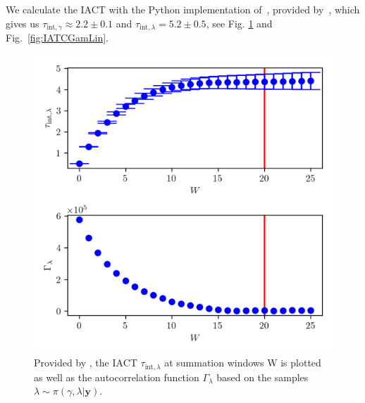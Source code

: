 We calculate the IACT with the Python implementation of~\cite{wolff2004monte}, provided by~\cite{drikHesse}, which gives us $\tau_{\text{int}, \gamma} \approx 2.2 \pm 0.1$ and $\tau_{\text{int}, \lambda} = 5.2 \pm 0.5 $, see Fig. \ref{fig:IATCLamLin} and Fig.~\ref{fig:IATCGamLin}.
\begin{figure}[h!]
	\centering
	\includegraphics{UwerrTauIntFirstO3lam.png}
	\caption[IACT of $\lambda$ samples from $\pi(\gamma, \lambda| \bm{y})$, for linear model.]{Provided by \cite{drikHesse}, the IACT $\tau_{\text{int},\lambda}$ at summation windows W is plotted as well as the autocorrelation function $\Gamma_{\lambda}$ based on the samples $\lambda \sim \pi(\gamma, \lambda| \bm{y})$.}
	\label{fig:IATCLamLin}
\end{figure}


